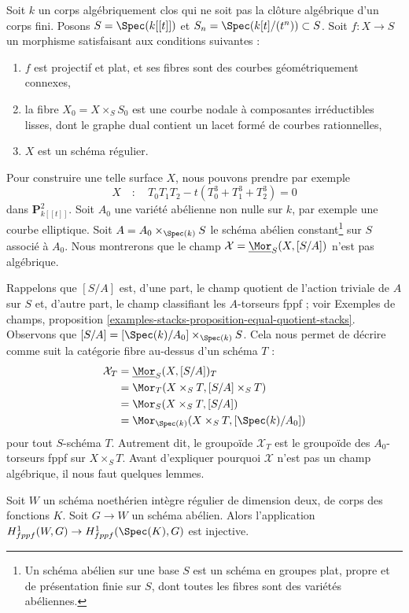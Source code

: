 \medskip\noindent
Soit $k$ un corps algébriquement clos qui ne soit pas la clôture
algébrique d'un corps fini. Posons $S = \Spec(k[[t]])$
et $S_n = \Spec(k[t]/(t^n)) \subset S$. Soit $f : X \to S$ un morphisme
satisfaisant aux conditions suivantes :
\begin{enumerate}
\item $f$ est projectif et plat, et ses fibres sont des courbes
géométriquement connexes,
\item la fibre $X_0 = X \times_S S_0$ est une courbe nodale à composantes
irréductibles lisses, dont le graphe dual contient un lacet formé de
courbes rationnelles,
\item $X$ est un schéma régulier.
\end{enumerate}
Pour construire une telle surface $X$, nous pouvons prendre par exemple
$$
X\quad :\quad T_0T_1T_2 - t(T_0^3 + T_1^3 + T_2^3) = 0
$$
dans $\mathbf{P}^2_{k[[t]]}$. Soit $A_0$ une variété abélienne non nulle sur $k$,
par exemple une courbe elliptique. Soit $A = A_0 \times_{\Spec(k)} S$ le
schéma abélien constant\footnote{Un schéma abélien sur une base $S$ est
un schéma en groupes plat, propre et de présentation finie sur $S$, dont
toutes les fibres sont des variétés abéliennes.}
sur $S$ associé à $A_0$. Nous montrerons que le
champ $\mathcal{X} = \underline{\Mor}_S(X, [S/A])$ n'est pas algébrique.

\medskip\noindent
Rappelons que $[S/A]$ est, d'une part, le champ quotient de l'action
triviale de $A$ sur $S$ et,
d'autre part, le champ classifiant les $A$-torseurs fppf ; voir
Exemples de champs, proposition
\ref{examples-stacks-proposition-equal-quotient-stacks}.
Observons que $[S/A] = [\Spec(k)/A_0] \times_{\Spec(k)} S$. Cela nous
permet de décrire comme suit la catégorie fibre au-dessus d'un schéma $T$ :
\begin{align*}
\mathcal{X}_T
& =
\underline{\Mor}_S(X, [S/A])_T \\
& =
\Mor_T(X \times_S T, [S/A] \times_S T) \\
& =
\Mor_S(X \times_S T, [S/A]) \\
& =
\Mor_{\Spec(k)}(X \times_S T, [\Spec(k)/A_0])
\end{align*}
pour tout $S$-schéma $T$. Autrement dit, le groupoïde $\mathcal{X}_T$
est le groupoïde des $A_0$-torseurs fppf sur $X \times_S T$.
Avant d'expliquer pourquoi $\mathcal{X}$ n'est pas un champ algébrique,
il nous faut quelques lemmes.

\begin{lemma}
\label{lemma-torsors-over-two-dimensional-regular}
Soit $W$ un schéma noethérien intègre régulier de dimension deux,
de corps des fonctions $K$. Soit $G \to W$ un schéma abélien.
Alors l'application
$H^1_{fppf}(W, G) \to H^1_{fppf}(\Spec(K), G)$ est injective.
\end{lemma}

